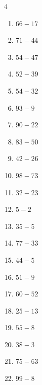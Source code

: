 \begin{multicols}{4}
\begin{enumerate}
  \item $66-17$
        \phantom{$=49$}

  \item $71-44$
        \phantom{$=27$}

  \item $54-47$
        \phantom{$=7$}

  \item $52-39$
        \phantom{$=13$}

  \item $54-32$
        \phantom{$=22$}

  \item $93-9$
        \phantom{$=84$}

  \item $90-22$
        \phantom{$=68$}

  \item $83-50$
        \phantom{$=33$}

  \item $42-26$
        \phantom{$=16$}

  \item $98-73$
        \phantom{$=25$}

  \item $32-23$
        \phantom{$=9$}

  \item $5-2$
        \phantom{$=3$}

  \item $35-5$
        \phantom{$=30$}

  \item $77-33$
        \phantom{$=44$}

  \item $44-5$
        \phantom{$=39$}

  \item $51-9$
        \phantom{$=42$}

  \item $60-52$
        \phantom{$=8$}

  \item $25-13$
        \phantom{$=12$}

  \item $55-8$
        \phantom{$=47$}

  \item $38-3$
        \phantom{$=35$}

  \item $75-63$
        \phantom{$=12$}

  \item $99-8$
        \phantom{$=91$}


\end{enumerate}
\end{multicols}
